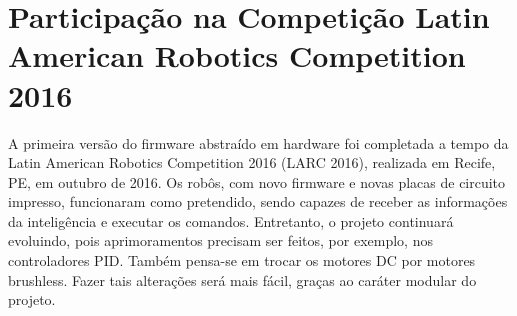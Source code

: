 \chapter{Participação na Competição Latin American Robotics Competition 2016}\label{cap:larc_2016}

A primeira versão do firmware abstraído em hardware foi completada a tempo da Latin American Robotics Competition 2016 (LARC 2016), realizada em Recife, PE, em outubro de 2016. Os robôs, com novo firmware e novas placas de circuito impresso, funcionaram como pretendido, sendo capazes de receber as informações da inteligência e executar os comandos. Entretanto, o projeto continuará evoluindo, pois aprimoramentos precisam ser feitos, por exemplo, nos controladores PID. Também pensa-se em trocar os motores DC por motores brushless. Fazer tais alterações será mais fácil, graças ao caráter modular do projeto.



